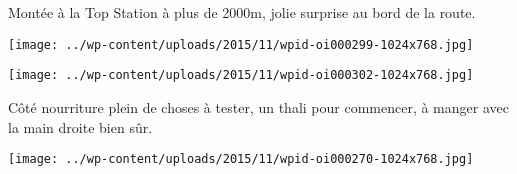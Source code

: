 Montée à la Top Station à plus de 2000m, jolie surprise au bord de la route. 
\begin{center} \texttt{[image: ../wp-content/uploads/2015/11/wpid-oi000299-1024x768.jpg]} \end{center}
\begin{center} \texttt{[image: ../wp-content/uploads/2015/11/wpid-oi000302-1024x768.jpg]} \end{center}
\vspace{-\topsep}
\vspace{-2.75mm}
\pagebreak
 
 Côté nourriture plein de choses à tester, un thali pour commencer, à manger avec la main droite bien sûr. 
 \vspace{8mm}
\begin{center} \texttt{[image: ../wp-content/uploads/2015/11/wpid-oi000270-1024x768.jpg]} \end{center}
